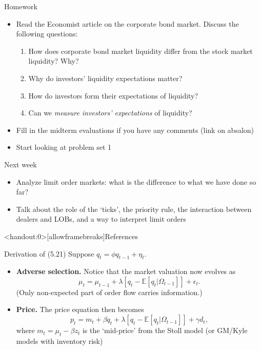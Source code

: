 \documentclass[english,10pt
,aspectratio=169
]{beamer}
\begin{document}
\begin{frame}{Homework}
\begin{itemize}
	\item Read the Economist article on the corporate bond market. Discuss the following questions:
	\begin{enumerate}
		\item How does corporate bond market liquidity differ from the stock market liquidity? Why?
		\item Why do investors' liquidity expectations matter?
		\item How do investors form their expectations of liquidity?
		\item Can we \emph{measure investors' expectations} of liquidity?
	\end{enumerate}
	\item Fill in the midterm evaluations if you have any comments (link on absalon)
	\item Start looking at problem set 1
\end{itemize}
\end{frame}


\begin{frame}{Next week}
\begin{itemize}
	\item Analyze limit order markets: what is the difference to what we have done so far?
	\item Talk about the role of the `ticks', the priority rule, the interaction between dealers and LOBs, and a way to interpret limit orders
\end{itemize}
\end{frame}




\appendix
\begin{frame}<handout:0>[allowframebreaks]{References}


\end{frame}



\begin{frame}[label=derivation, noframenumbering]{Derivation of (5.21)}
	Suppose $q_t=\phi q_{t-1}+\eta_{t}$. 
	\begin{itemize}
		\item \textbf{Adverse selection.} Notice that the market valuation now evolves as
		\[
		\mu_t=\mu_{t-1}+\lambda[q_t-\mathbb{E}[q_t|\Omega_{t-1}]]+\epsilon_t.
		\]
		(Only non-expected part of order flow carries information.)
		\item \textbf{Price.} The price equation then becomes
		\[
		p_t=m_t+\beta q_t+\lambda[q_t-\mathbb{E}[q_t|\Omega_{t-1}]]+\gamma d_t,
		\]
		where $m_t=\mu_t-\beta z_t$ is the `mid-price' from the Stoll model (or GM/Kyle models with inventory risk)
	\end{itemize}
\end{frame}
\end{document}
